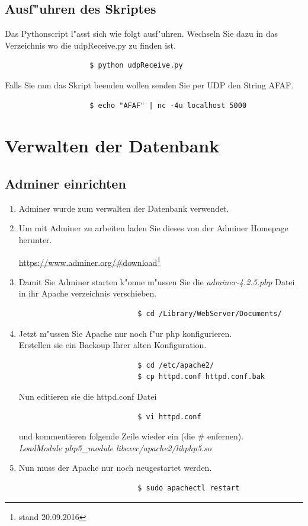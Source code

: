 \documentclass[oneside, a4paper, 11pt]{report}
\begin{document}
			\subsection{Ausf"uhren des Skriptes}
				Das Pythonscript l"asst sich wie folgt ausf"uhren. Wechseln Sie dazu in das Verzeichnis wo die udpReceive.py  zu finden ist.
				\begin{verbatim}
					$ python udpReceive.py 
				\end{verbatim}
				Falls Sie nun das Skript beenden wollen senden Sie per UDP den String \glqq{}AFAF\grqq{}.
				\begin{verbatim}
					$ echo "AFAF" | nc -4u localhost 5000
				\end{verbatim}
		\section{Verwalten der Datenbank}
			\subsection{Adminer einrichten}
				\begin{enumerate}	
					\item[]
						Adminer wurde zum verwalten der Datenbank verwendet.
					\item
						Um mit Adminer zu arbeiten laden Sie dieses von der Adminer Homepage herunter.
						\begin{center}
							\url{https://www.adminer.org/#download}\footnote{stand 20.09.2016}
						\end{center}
					\item 
						Damit Sie Adminer starten k"onne m"ussen Sie die \textit{adminer-4.2.5.php} Datei in ihr Apache verzeichnis verschieben.
						\begin{verbatim}
							$ cd /Library/WebServer/Documents/
						\end{verbatim}
					\item 
						Jetzt m"ussen Sie Apache nur noch f"ur php konfigurieren.\\
						Erstellen sie ein Backoup Ihrer alten Konfiguration.
						\begin{verbatim}
							$ cd /etc/apache2/
							$ cp httpd.conf httpd.conf.bak
						\end{verbatim}
						Nun editieren sie die httpd.conf Datei 
						\begin{verbatim}
							$ vi httpd.conf
						\end{verbatim}
						und kommentieren folgende Zeile wieder ein (die \# enfernen).\\
						\textit{LoadModule php5\_module libexec/apache2/libphp5.so}
					\item 
						Nun muss der Apache nur noch neugestartet werden.
						\begin{verbatim}
							$ sudo apachectl restart	
						\end{verbatim}
				\end{enumerate}
\end{document}

